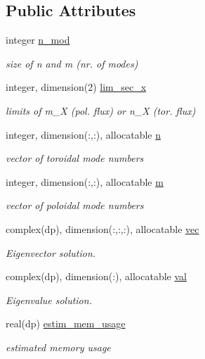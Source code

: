 \subsection*{Public Attributes}
\begin{DoxyCompactItemize}
\item 
integer \hyperlink{structsol__vars_1_1sol__type_a05faca84fd837b32985ae5c4fdadb6da}{n\+\_\+mod}
\begin{DoxyCompactList}\small\item\em size of n and m (nr. of modes) \end{DoxyCompactList}\item 
integer, dimension(2) \hyperlink{structsol__vars_1_1sol__type_a2192f30619609d910a999dc6a8934934}{lim\+\_\+sec\+\_\+x}
\begin{DoxyCompactList}\small\item\em limits of {\ttfamily m\+\_\+X} (pol. flux) or {\ttfamily n\+\_\+X} (tor. flux) \end{DoxyCompactList}\item 
integer, dimension(\+:,\+:), allocatable \hyperlink{structsol__vars_1_1sol__type_acb5f4ea951583b240591bce4e32f5230}{n}
\begin{DoxyCompactList}\small\item\em vector of toroidal mode numbers \end{DoxyCompactList}\item 
integer, dimension(\+:,\+:), allocatable \hyperlink{structsol__vars_1_1sol__type_ad00b40efc03a825e83a58b6ef6b29e2b}{m}
\begin{DoxyCompactList}\small\item\em vector of poloidal mode numbers \end{DoxyCompactList}\item 
complex(dp), dimension(\+:,\+:,\+:), allocatable \hyperlink{structsol__vars_1_1sol__type_a5e21f3c7b6581901982958615c3f936e}{vec}
\begin{DoxyCompactList}\small\item\em Eigenvector solution. \end{DoxyCompactList}\item 
complex(dp), dimension(\+:), allocatable \hyperlink{structsol__vars_1_1sol__type_a4cb91aeea05a69a04dceef7951be1004}{val}
\begin{DoxyCompactList}\small\item\em Eigenvalue solution. \end{DoxyCompactList}\item 
real(dp) \hyperlink{structsol__vars_1_1sol__type_a16f8e9b26e0d976589c79fe534982617}{estim\+\_\+mem\+\_\+usage}
\begin{DoxyCompactList}\small\item\em estimated memory usage \end{DoxyCompactList}\end{DoxyCompactItemize}


